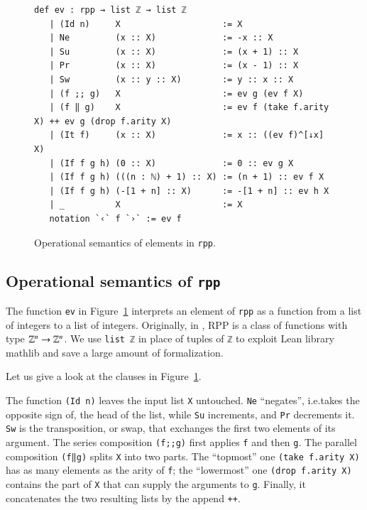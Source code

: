 \documentclass[preprint]{elsarticle}
\theoremstyle{remark}
\newcommand{\RPP}{\textsf{RPP}\xspace}
\newcommand{\MATHLIB}{\textsf{mathlib}\xspace}
\newcommand{\LEAN}{\textsf{Lean}\xspace}
\begin{document}
\begin{figure}
\begin{lstlisting}[basicstyle=\small]
   def ev : rpp → list ℤ → list ℤ
   | (Id n)     X                    := X
   | Ne         (x :: X)             := -x :: X
   | Su         (x :: X)             := (x + 1) :: X
   | Pr         (x :: X)             := (x - 1) :: X
   | Sw         (x :: y :: X)        := y :: x :: X
   | (f ;; g)   X                    := ev g (ev f X)
   | (f ‖ g)    X                    := ev f (take f.arity X) ++ ev g (drop f.arity X)
   | (It f)     (x :: X)             := x :: ((ev f)^[↓x] X)
   | (If f g h) (0 :: X)             := 0 :: ev g X
   | (If f g h) (((n : ℕ) + 1) :: X) := (n + 1) :: ev f X
   | (If f g h) (-[1 + n] :: X)      := -[1 + n] :: ev h X
   | _          X                    := X
   notation `‹` f `›` := ev f
\end{lstlisting}
\caption{Operational semantics of elements in \lstinline|rpp|.}
\label{fig:RPP-ev}
\end{figure}

\subsection{Operational semantics of {\normalfont \lstinline|rpp|}}
The function \lstinline|ev| in Figure~\ref{fig:RPP-ev} interprets an element of \lstinline|rpp| as a function from a list of integers to a list of integers. Originally, in \cite{DBLP:journals/tcs/PaoliniPR20}, \RPP is a class of functions with type $ \mathbb{Z}^n \rightarrow \mathbb{Z}^n $. We use \lstinline|list ℤ| in place of tuples of \lstinline|ℤ| to exploit  \LEAN library \MATHLIB and save a large amount of formalization.

Let us give a look at the clauses in Figure~\ref{fig:RPP-ev}.

The function \lstinline|(Id n)| leaves the input list \lstinline|X| untouched.
\lstinline|Ne| ``negates'', i.e.\@ takes the opposite sign of, the head of the list, while \lstinline|Su| increments, and \lstinline|Pr| decrements it.
\lstinline|Sw| is the transposition, or swap, that exchanges the first two elements of its argument.
The series composition \lstinline|(f;;g)| first applies \lstinline|f| and then
\lstinline|g|.
The parallel composition \lstinline|(f‖g)| splits \lstinline|X| into two parts. The ``topmost'' one \lstinline|(take f.arity X)| has as many elements as the arity of \lstinline|f|; the ``lowermost'' one \lstinline|(drop f.arity X)| contains the part of \lstinline|X| that can supply the arguments to \lstinline|g|. Finally, it concatenates the two resulting lists by the append \lstinline|++|.
\end{document}
